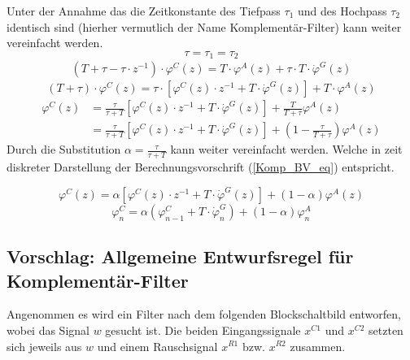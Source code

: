 \documentclass{article}
\begin{document}
Unter der Annahme das die Zeitkonstante des Tiefpass $\tau_1$ und des Hochpass $\tau_2$ identisch sind (hierher vermutlich der Name Komplementär-Filter) kann weiter vereinfacht werden.
\begin{equation}
\tau = \tau_1 = \tau_2
\end{equation}
\begin{equation}
\begin{split}
(T + \tau - \tau \cdot z^{-1}) \cdot \varphi^C(z) = T \cdot \varphi^A(z) + \tau \cdot T \cdot \dot{\varphi}^G(z)
\end{split}
\end{equation}
\begin{equation}
(T + \tau) \cdot \varphi^C(z) = \tau \cdot [\varphi^C(z) \cdot z^{-1}  + T \cdot \dot{\varphi}^G(z)] + T \cdot \varphi^A(z)
\end{equation}
\begin{equation}
\begin{split}
\varphi^C(z) & = \frac{\tau}{\tau + T}[\varphi^C(z) \cdot z^{-1}  + T \cdot \dot{\varphi}^G(z)] + \frac{T}{T + \tau} \varphi^A(z) \\
& = \frac{\tau}{\tau + T}[\varphi^C(z) \cdot z^{-1}  + T \cdot \dot{\varphi}^G(z)] + (1 - \frac{\tau}{T + \tau}) \varphi^A(z)
\end{split}
\end{equation}
Durch die Substitution $\alpha = \frac{\tau}{\tau + T}$ kann weiter vereinfacht werden. Welche in zeit diskreter Darstellung der Berechnungsvorschrift (\ref{Komp_BV_eq}) entspricht.

\begin{equation}
\varphi^C(z)  = \alpha[\varphi^C(z) \cdot z^{-1}  + T \cdot \dot{\varphi}^G(z)] + (1 - \alpha) \varphi^A(z)
\end{equation}
\begin{equation}
\varphi^C_n = \alpha(\varphi^C_{n-1}  + T \cdot \dot{\varphi}^G_n) + (1 - \alpha) \varphi^A_n
\end{equation}

\subsection{Vorschlag: Allgemeine Entwurfsregel für Komplementär-Filter}
Angenommen es wird ein Filter nach dem folgenden Blockschaltbild entworfen, wobei das Signal $w$ gesucht ist. Die beiden Eingangssignale $x^{C1}$ und $x^{C2}$ setzten sich jeweils aus $w$ und einem Rauschsignal $x^{R1}$ bzw. $x^{R2}$ zusammen.
\end{document}

